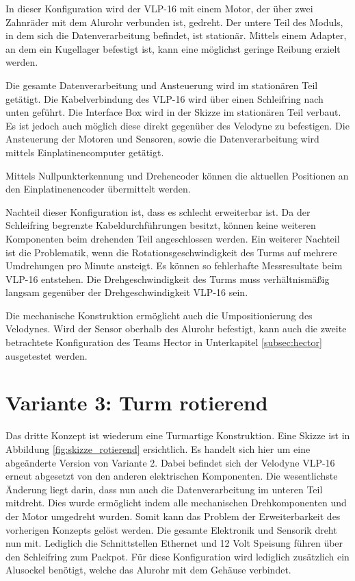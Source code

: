 In dieser Konfiguration wird der VLP-16 mit einem Motor, der über zwei Zahnräder mit dem Alurohr verbunden ist, gedreht. Der untere Teil des Moduls, in dem sich die Datenverarbeitung befindet, ist stationär. Mittels einem Adapter, an dem ein Kugellager befestigt ist, kann eine möglichst geringe Reibung erzielt werden.

Die gesamte Datenverarbeitung und Ansteuerung wird im stationären Teil getätigt. Die Kabelverbindung des VLP-16 wird über einen Schleifring nach unten geführt. Die Interface Box wird in der Skizze im stationären Teil verbaut. Es ist jedoch auch möglich diese direkt gegenüber des Velodyne zu befestigen. Die Ansteuerung der Motoren und Sensoren, sowie die Datenverarbeitung wird mittels Einplatinencomputer getätigt.

Mittels Nullpunkterkennung und Drehencoder können die aktuellen Positionen an den Einplatinenencoder übermittelt werden.

Nachteil dieser Konfiguration ist, dass es schlecht erweiterbar ist. Da der Schleifring begrenzte Kabeldurchführungen besitzt, können keine weiteren Komponenten beim drehenden Teil angeschlossen werden. Ein weiterer Nachteil ist die Problematik, wenn die Rotationsgeschwindigkeit des Turms auf mehrere Umdrehungen pro Minute ansteigt. Es können so fehlerhafte Messresultate beim VLP-16 entstehen. Die Drehgeschwindigkeit des Turms muss verhältnismäßig langsam gegenüber der Drehgeschwindigkeit VLP-16 sein.

Die mechanische Konstruktion ermöglicht auch die Umpositionierung des Velodynes. Wird der Sensor oberhalb des Alurohr befestigt, kann auch die zweite betrachtete Konfiguration des Teams Hector in Unterkapitel \ref{subsec:hector} ausgetestet werden.

\section {Variante 3: Turm rotierend}
\label{sec:var3}
Das dritte Konzept ist wiederum eine Turmartige Konstruktion. Eine Skizze ist in Abbildung \ref{fig:skizze_rotierend} ersichtlich. Es handelt sich hier um eine abgeänderte Version von Variante 2. Dabei befindet sich der Velodyne VLP-16 erneut abgesetzt von den anderen elektrischen Komponenten. Die wesentlichste Änderung liegt darin, dass nun auch die Datenverarbeitung im unteren Teil mitdreht. 
Dies wurde ermöglicht indem alle mechanischen Drehkomponenten und der Motor umgedreht wurden. Somit kann das Problem der Erweiterbarkeit des vorherigen Konzepts gelöst werden. Die gesamte Elektronik und Sensorik dreht nun mit. Lediglich die Schnittstellen Ethernet und 12 Volt Speisung führen über den Schleifring zum Packpot. Für diese Konfiguration wird lediglich zusätzlich ein Alusockel benötigt, welche das Alurohr mit dem Gehäuse verbindet. 

